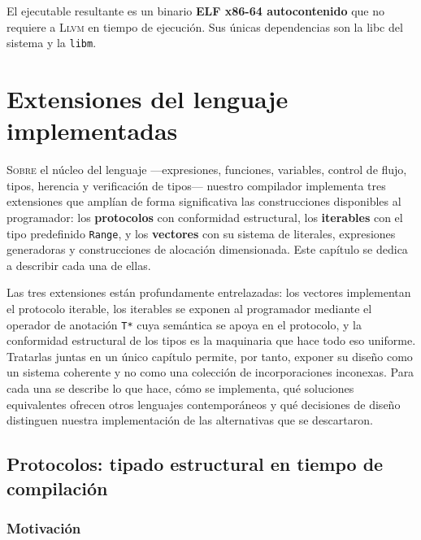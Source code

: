 \documentclass[11pt,a4paper,oneside,openany]{report}
\newcommand{\code}[1]{\texttt{#1}}
\newcommand{\llvm}{\textsc{Llvm}}
\begin{document}
El ejecutable resultante es un binario \textbf{ELF x86-64 autocontenido} que no
requiere a \llvm{} en tiempo de ejecución. Sus únicas dependencias son la libc del
sistema y la \code{libm}.

\chapter{Extensiones del lenguaje implementadas}
\label{cap:ext}

\lettrine[lines=2,findent=2pt,nindent=0pt]{S}{obre} el núcleo del lenguaje
---expresiones, funciones, variables, control de flujo, tipos, herencia y
verificación de tipos--- nuestro compilador implementa tres extensiones que
amplían de forma significativa las construcciones disponibles al programador:
los \textbf{protocolos} con conformidad estructural, los \textbf{iterables}
con el tipo predefinido \code{Range}, y los \textbf{vectores} con su sistema
de literales, expresiones generadoras y construcciones de alocación
dimensionada. Este capítulo se dedica a describir cada una de ellas.

Las tres extensiones están profundamente entrelazadas: los vectores
implementan el protocolo iterable, los iterables se exponen al programador
mediante el operador de anotación \code{T*} cuya semántica se apoya en el
protocolo, y la conformidad estructural de los tipos es la maquinaria que
hace todo eso uniforme. Tratarlas juntas en un único capítulo permite, por
tanto, exponer su diseño como un sistema coherente y no como una colección
de incorporaciones inconexas. Para cada una se describe lo que hace, cómo se
implementa, qué soluciones equivalentes ofrecen otros lenguajes
contemporáneos y qué decisiones de diseño distinguen nuestra implementación
de las alternativas que se descartaron.

\section{Protocolos: tipado estructural en tiempo de compilación}
\label{sec:ext-proto}

\subsection{Motivación}
\end{document}
